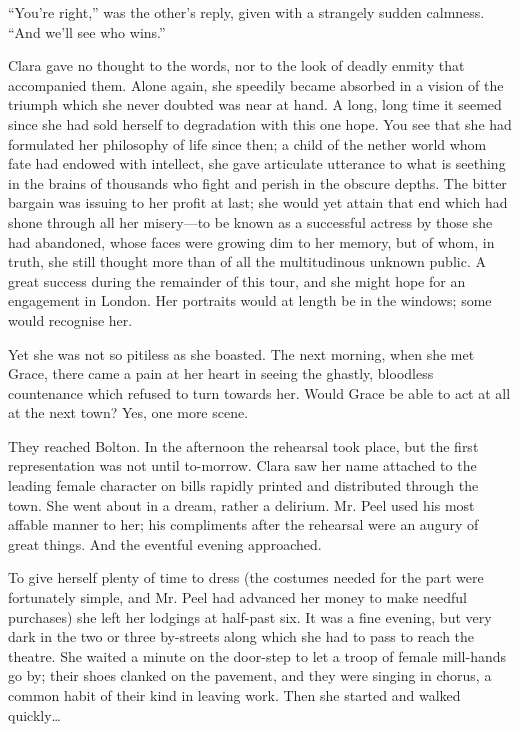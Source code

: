 ``You're right,'' was the other's reply, given with a strangely sudden
calmness. ``And we'll see who wins.''

Clara gave no thought to the words, nor to the look of deadly enmity
that accompanied them. Alone again, she speedily became absorbed in a
vision of the triumph which she never doubted was near at hand. A long,
long time it seemed since she had sold herself to degradation with this
one hope. You see that she had formulated her philosophy of life since
then; a child of the nether world whom fate had endowed with intellect,
she gave articulate utterance to what is seething in the brains of
thousands who fight and perish in the obscure depths. The bitter bargain
was issuing to her profit at last; she would yet attain that end which
had shone through all her misery---to be known as a successful actress
by those she had abandoned, whose faces were growing dim to her memory,
but of whom, in truth, she still {}thought more than of all the
multitudinous unknown public. A great success during the remainder of
this tour, and she might hope for an engagement in London. Her portraits
would at length be in the windows; some would recognise her.

Yet she was not so pitiless as she boasted. The next morning, when she
met Grace, there came a pain at her heart in seeing the ghastly,
bloodless countenance which refused to turn towards her. Would Grace be
able to act at all at the next town? Yes, one more scene.

They reached Bolton. In the afternoon the rehearsal took place, but the
first representation was not until to-morrow. Clara saw her name
attached to the leading female character on bills rapidly printed and
distributed through the town. She went about in a dream, rather a
delirium. Mr. Peel used his most affable manner to her; his compliments
after the rehearsal were an augury of great things. And the eventful
evening approached.

{}To give herself plenty of time to dress (the costumes needed for the
part were fortunately simple, and Mr. Peel had advanced her money to
make needful purchases) she left her lodgings at half-past six. It was a
fine evening, but very dark in the two or three by-streets along which
she had to pass to reach the theatre. She waited a minute on the
door-step to let a troop of female mill-hands go by; their shoes clanked
on the pavement, and they were singing in chorus, a common habit of
their kind in leaving work. Then she started and walked quickly\ldots{}


